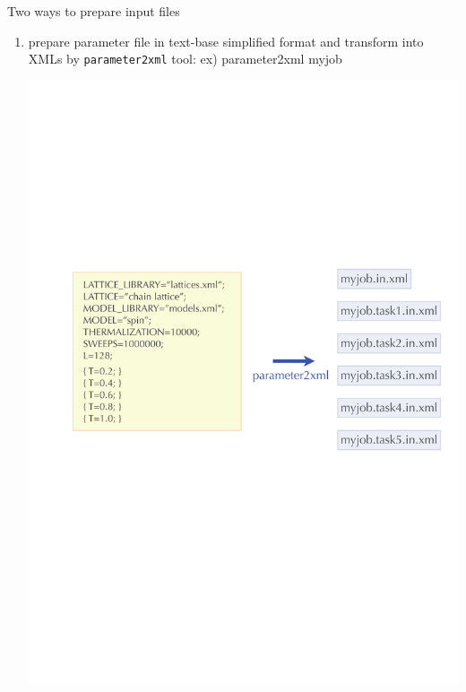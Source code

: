 \begin{frame}[t,fragile]{Two ways to prepare input files}
  \begin{enumerate}
    \setlength{\itemsep}{1em}
    \setcounter{enumi}{1}
  \item prepare parameter file in text-base simplified format and transform into XMLs by {\tt parameter2xml} tool: ex) parameter2xml myjob
    \begin{center}
      \includegraphics[height=.6\textheight]{simulation4.pdf}
    \end{center}
  \end{enumerate}
\end{frame}

